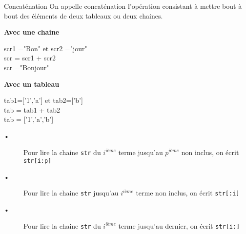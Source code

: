 \begin{DefT}{Concaténation}
On appelle concaténation l'opération consistant à mettre bout à bout des éléments de deux tableaux ou deux chaines.
\end{DefT}

\begin{Ex}
\begin{minipage}[t]{0.49\linewidth}
\textbf{Avec une chaine}

scr1 ="Bon" et scr2 ="jour"\\
scr = scr1 + scr2\\
scr ="Bonjour"
\end{minipage}
\hfill\vrule\hfill
\begin{minipage}[t]{0.49\linewidth}
\textbf{Avec un tableau}

tab1=['1','a'] et tab2=['b']\\
tab = tab1 + tab2\\
tab = ['1','a','b']
\end{minipage}
\end{Ex}

\begin{Mt}
\begin{description}
\item[•] Pour lire la chaine \texttt{str} du $i^{ième}$ terme jusqu'au $p^{ième}$ non inclus, on écrit \texttt{str[i:p]}
\item[•] Pour lire la chaine \texttt{str} jusqu'au $i^{ième}$ terme non inclus, on écrit \texttt{str[:i]}
\item[•] Pour lire la chaine \texttt{str} du $i^{ième}$ terme jusqu'au dernier, on écrit \texttt{str[i:]}
\end{description}
\end{Mt}


